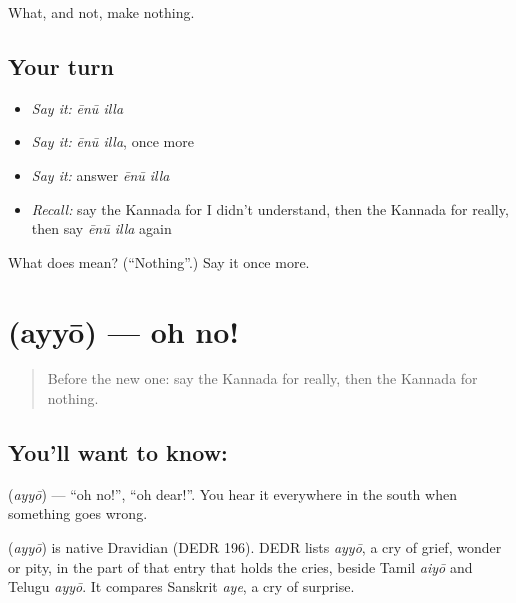 \begin{grammarlens}[title={What you've built}]
What, and not, make nothing.
\end{grammarlens}

\subsection*{Your turn}
\begin{itemize}
\raggedright
  \item \emph{Say it:} \emph{ēnū illa}
  \item \emph{Say it:} \emph{ēnū illa}, once more
  \item \emph{Say it:} answer \emph{ēnū illa}
  \item \emph{Recall:} say the Kannada for I didn't understand, then the Kannada for really, then say \emph{ēnū illa} again
\end{itemize}

\begin{tcolorbox}[breakable,colback=teal!4,colframe=teal!35!black,title={Before you move on}]
What does   mean? (\textquotedblleft{}Nothing\textquotedblright{}.) Say it once more.
\end{tcolorbox}
\section[\texorpdfstring{\kn{ಅಯ್ಯೋ} (ayyō)}{ಅಯ್ಯೋ (ayyō)}]{ (ayyō) — oh no!}

\label{lesson:KA-C87-ohno}



\begin{quote}
Before the new one: say the Kannada for really, then the Kannada for nothing.
\end{quote}

\subsection*{You'll want to know: }
\textbf{} (\emph{ayyō}) — \textquotedblleft{}oh no!\textquotedblright{}, \textquotedblleft{}oh dear!\textquotedblright{}. You hear it everywhere in the south when something goes wrong.

\begin{cousinweb}
\textbf{} (\emph{ayyō}) is native Dravidian (DEDR 196). DEDR lists \emph{ayyō}, a cry of grief, wonder or pity, in the part of that entry that holds the cries, beside Tamil \emph{aiyō} and Telugu \emph{ayyō}. It compares Sanskrit \emph{aye}, a cry of surprise.
\end{cousinweb}

